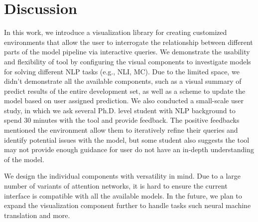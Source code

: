 \section{Discussion}
In this work, we introduce a visualization library for creating customized environments that allow the user to interrogate the relationship between different parts of the model pipeline via interactive queries.
%
We demonstrate the usability and flexibility of tool by configuring the visual components to investigate models for solving different NLP tasks (e.g., NLI, MC).
%
Due to the limited space, we didn't demonstrate all the available components, such as a visual summary of predict results of the entire development set, as well as a scheme to update the model based on user assigned prediction. 
%
We also conducted a small-scale user study, in which we ask several Ph.D. level student with NLP background to spend 30 minutes with the tool and provide feedback. The positive feedbacks mentioned the environment allow them to iteratively refine their queries and identify potential issues with the model, but some student also suggests the tool may not provide enough guidance for user do not have an in-depth understanding of the model.

We design the individual components with versatility in mind. Due to a large number of variants of attention networks, it is hard to ensure the current interface is compatible with all the available models.
%
In the future, we plan to expand the visualization component further to handle tasks such neural machine translation and more. 
